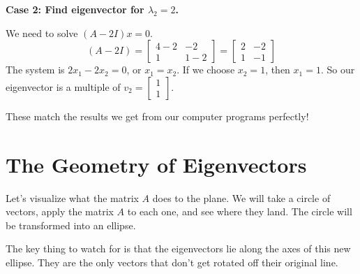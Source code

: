 \documentclass[
  letterpaper,
  DIV=11,
  numbers=noendperiod]{scrreprt}
\begin{document}
\textbf{Case 2: Find eigenvector for \(\lambda_2 = 2\).}

We need to solve \((A - 2I)x = 0\).
\[ (A - 2I) = \begin{bmatrix} 4-2 & -2 \\ 1 & 1-2 \end{bmatrix} = \begin{bmatrix} 2 & -2 \\ 1 & -1 \end{bmatrix} \]
The system is \(2x_1 - 2x_2 = 0\), or \(x_1 = x_2\). If we choose
\(x_2=1\), then \(x_1=1\). So our eigenvector is a multiple of
\(v_2 = \begin{bmatrix} 1 \\ 1 \end{bmatrix}\).

These match the results we get from our computer programs perfectly!

\section{The Geometry of
Eigenvectors}\label{the-geometry-of-eigenvectors}

Let's visualize what the matrix \(A\) does to the plane. We will take a
circle of vectors, apply the matrix \(A\) to each one, and see where
they land. The circle will be transformed into an ellipse.

The key thing to watch for is that the eigenvectors lie along the axes
of this new ellipse. They are the only vectors that don't get rotated
off their original line.
\end{document}
